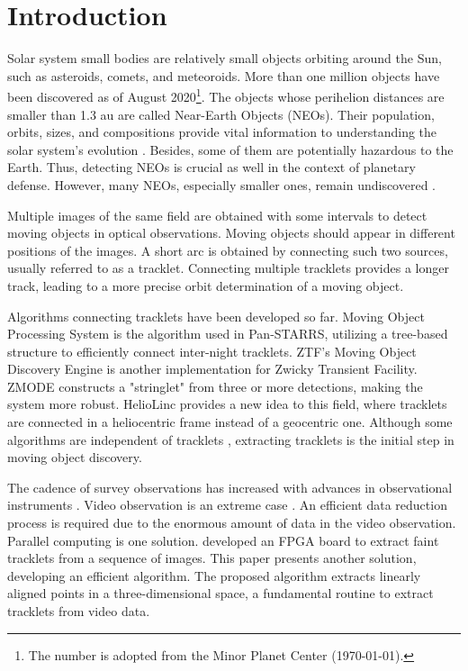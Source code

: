 
\section{Introduction}
\label{sec:intro}

Solar system small bodies are relatively small objects orbiting around the Sun, such as asteroids, comets, and meteoroids. More than one million objects have been discovered as of August 2020\footnote{The number is adopted from the Minor Planet Center (\today).}. The objects whose perihelion distances are smaller than 1.3 au are called Near-Earth Objects (NEOs). Their population, orbits, sizes, and compositions provide vital information to understanding the solar system's evolution \citep[e.g.,][]{granvik_debiased_2018,bottke_debiased_2002}. Besides, some of them are potentially hazardous to the Earth. Thus, detecting NEOs is crucial as well in the context of planetary defense. However, many NEOs, especially smaller ones, remain undiscovered \citep[e.g.,][]{harris_population_2015}.

Multiple images of the same field are obtained with some intervals to detect moving objects in optical observations. Moving objects should appear in different positions of the images. A short arc is obtained by connecting such two sources, usually referred to as a tracklet. Connecting multiple tracklets provides a longer track, leading to a more precise orbit determination of a moving object.

Algorithms connecting tracklets have been developed so far. Moving Object Processing System \citep[MOPS;][]{denneau_pan-starrs_2013,kubica_efficient_2007} is the algorithm used in Pan-STARRS, utilizing a tree-based structure to efficiently connect inter-night tracklets. ZTF's Moving Object Discovery Engine \citep[ZMODE;][]{masci_zwicky_2019} is another implementation for Zwicky Transient Facility. ZMODE constructs a "stringlet" \citep{waszczak_main-belt_2013} from three or more detections, making the system more robust. HelioLinc provides a new idea to this field, where tracklets are connected in a heliocentric frame instead of a geocentric one. Although some algorithms are independent of tracklets \citep[THOR;][]{moeyens_thor_2021}, extracting tracklets is the initial step in moving object discovery.

The cadence of survey observations has increased with advances in observational instruments \citep[e.g., Pan-STARRS, ZFS, ATLAS, ASAS-SN, and EvryScope;][]{chambers_pan-starrs1_2016,magnier_pan-starrs_2016,dekany_zwicky_2020,tonry_atlas:_2018,kochanek_all-sky_2017,law_evryscope_2015}. Video observation is an extreme case \citep[e.g., Tomo-e Gozen, OASES, and TAOS2;][]{sako_tomo-e_2018,arimatsu_organized_2017,huang_taos_2021,lehner_status_2018}. An efficient data reduction process is required due to the enormous amount of data in the video observation. Parallel computing is one solution. \citet{yanagisawa_automatic_2005} developed an FPGA board to extract faint tracklets from a sequence of images. This paper presents another solution, developing an efficient algorithm. The proposed algorithm extracts linearly aligned points in a three-dimensional space, a fundamental routine to extract tracklets from video data.

